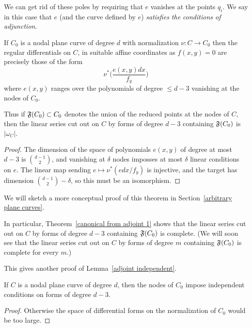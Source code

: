 We can get rid of these poles by requiring that $e$ vanishes at the points $q_i$. We say in this case that $e$ (and the curve defined by $e$) \emph{satisfies the conditions of adjunction}. 

\begin{theorem}\label{canonical from adjoint 1}
If $C_{0}$ is a nodal plane curve of degree $d$ with normalization $\nu: C\to C_{0}$
then the  regular differentials on  $C$, in suitable affine coordinates as $f(x,y) = 0$ 
 are precisely those of the form
 $$
\nu^{*}\biggl( \frac{e(x,y)dx}{f_{y}}\biggr)
$$
where 
$e(x,y)$ ranges over the polynomials of degree $\leq d-3$
vanishing at the nodes of $C_{0}.$

Thus if $\adj(C_{0})\subset C_{0}$ denotes the union
of the reduced points at the nodes of $C$, then  the linear series cut out on $C$ by 
forms of degree $d-3$ containing $\adj(C_{0})$ is $|\omega_{C}|$.
\end{theorem}

\begin{proof}
The dimension of the space of polynomials $e(x,y)$ of degree at most $d-3$ is $\binom{d-1}{2}$,
and vanishing at $\delta$ nodes imposses at most $\delta$ linear conditions on $e$. The linear map sending
$e\mapsto \nu^{*}(edx/f_{y})$ is injective, and the target has dimension 
$\binom{d-1}{2}-\delta$, so this must be an isomorphism.
\end{proof}
We will sketch a more conceptual proof of this theorem in Section~\ref{arbitrary plane curves}.

In particular, Theorem~\ref{canonical from adjoint 1}
shows that the linear series cut out on $C$ by 
forms of degree $d-3$ containing $\adj(C_{0})$ is complete. (We will soon see that
 the linear series cut out on $C$ by 
forms of degree $m$ containing $\adj(C_{0})$ is complete for every $m$.)


This gives another proof of Lemma~\ref{adjoint independent}.

\begin{corollary}
If $C$ is a nodal plane curve of degree $d$, then the nodes of $C_{0}$ impose independent
conditions on forms of degree $d-3$.
\end{corollary}
\begin{proof}
 Otherwise the space of differential forms on the normalization of $C_{0}$ would be too large.
\end{proof}


